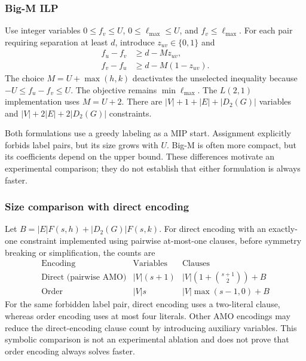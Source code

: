 \subsubsection{Big-M ILP}
Use integer variables $0\leq f_v\leq U$, $0\leq\ell_{\max}\leq U$, and
$f_v\leq\ell_{\max}$. For each pair requiring separation at least $d$,
introduce $z_{uv}\in\{0,1\}$ and
\begin{align}
 f_u-f_v&\geq d-Mz_{uv},\\
 f_v-f_u&\geq d-M(1-z_{uv}).
\end{align}
The choice $M=U+\max(h,k)$ deactivates the unselected inequality because
$-U\leq f_u-f_v\leq U$. The objective remains $\min\ell_{\max}$.
The $L(2,1)$ implementation uses $M=U+2$. There are
$|V|+1+|E|+|D_2(G)|$ variables and
$|V|+2|E|+2|D_2(G)|$ constraints.

Both formulations use a greedy labeling as a MIP start. Assignment explicitly
forbids label pairs, but its size grows with $U$. Big-M is often more compact,
but its coefficients depend on the upper bound. These differences motivate
an experimental comparison; they do not establish that either formulation
is always faster.

\subsubsection{Size comparison with direct encoding}
Let $B=|E|F(s,h)+|D_2(G)|F(s,k)$. For direct encoding with an exactly-one
constraint implemented using pairwise at-most-one clauses, before symmetry
breaking or simplification, the counts are
\[
\begin{array}{c|c|c}
\text{Encoding}&\text{Variables}&\text{Clauses}\\\hline
\text{Direct (pairwise AMO)}&|V|(s+1)&|V|\left(1+\binom{s+1}{2}\right)+B\\
\text{Order}&|V|s&|V|\max(s-1,0)+B
\end{array}
\]
For the same forbidden label pair, direct encoding uses a two-literal clause,
whereas order encoding uses at most four literals. Other AMO encodings may
reduce the direct-encoding clause count by introducing auxiliary variables.
This symbolic comparison is not an experimental ablation and does not prove
that order encoding always solves faster.
